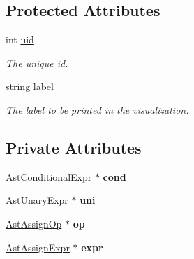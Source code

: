 \subsection*{Protected Attributes}
\begin{DoxyCompactItemize}
\item 
\hypertarget{classAST_a847b778f1c3dd5a19de32de432ee6e15}{int \hyperlink{classAST_a847b778f1c3dd5a19de32de432ee6e15}{uid}}\label{classAST_a847b778f1c3dd5a19de32de432ee6e15}

\begin{DoxyCompactList}\small\item\em The unique id. \end{DoxyCompactList}\item 
\hypertarget{classAST_ab2e239ccc0688d2341724432ff5a1a31}{string \hyperlink{classAST_ab2e239ccc0688d2341724432ff5a1a31}{label}}\label{classAST_ab2e239ccc0688d2341724432ff5a1a31}

\begin{DoxyCompactList}\small\item\em The label to be printed in the visualization. \end{DoxyCompactList}\end{DoxyCompactItemize}
\subsection*{Private Attributes}
\begin{DoxyCompactItemize}
\item 
\hypertarget{classAstAssignExpr_a4cd1ae5117f9a82a7d2a86b805bcbe65}{\hyperlink{classAstConditionalExpr}{Ast\-Conditional\-Expr} $\ast$ {\bfseries cond}}\label{classAstAssignExpr_a4cd1ae5117f9a82a7d2a86b805bcbe65}

\item 
\hypertarget{classAstAssignExpr_af43cb0cbb84266a8d32f65709cac5f7d}{\hyperlink{classAstUnaryExpr}{Ast\-Unary\-Expr} $\ast$ {\bfseries uni}}\label{classAstAssignExpr_af43cb0cbb84266a8d32f65709cac5f7d}

\item 
\hypertarget{classAstAssignExpr_a7ec89e32e29bac63d93cbb6cbe3d9640}{\hyperlink{classAstAssignOp}{Ast\-Assign\-Op} $\ast$ {\bfseries op}}\label{classAstAssignExpr_a7ec89e32e29bac63d93cbb6cbe3d9640}

\item 
\hypertarget{classAstAssignExpr_a9a0136ca49b4855fbd69d8a1b6ca7296}{\hyperlink{classAstAssignExpr}{Ast\-Assign\-Expr} $\ast$ {\bfseries expr}}\label{classAstAssignExpr_a9a0136ca49b4855fbd69d8a1b6ca7296}

\end{DoxyCompactItemize}


